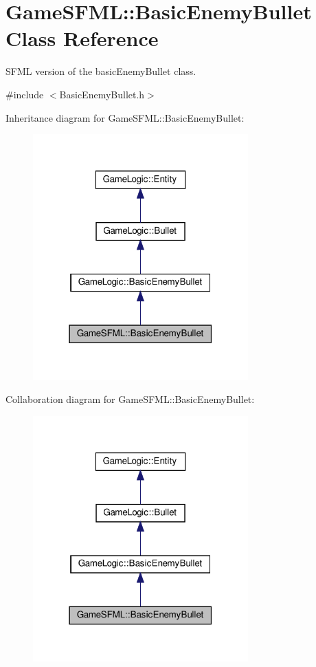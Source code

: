 \hypertarget{classGameSFML_1_1BasicEnemyBullet}{}\section{Game\+S\+F\+ML\+:\+:Basic\+Enemy\+Bullet Class Reference}
\label{classGameSFML_1_1BasicEnemyBullet}


S\+F\+ML version of the basic\+Enemy\+Bullet class.  




{\ttfamily \#include $<$Basic\+Enemy\+Bullet.\+h$>$}



Inheritance diagram for Game\+S\+F\+ML\+:\+:Basic\+Enemy\+Bullet\+:
\nopagebreak
\begin{figure}[H]
\begin{center}
\leavevmode
\includegraphics[width=235pt]{classGameSFML_1_1BasicEnemyBullet__inherit__graph}
\end{center}
\end{figure}


Collaboration diagram for Game\+S\+F\+ML\+:\+:Basic\+Enemy\+Bullet\+:
\nopagebreak
\begin{figure}[H]
\begin{center}
\leavevmode
\includegraphics[width=235pt]{classGameSFML_1_1BasicEnemyBullet__coll__graph}
\end{center}
\end{figure}
